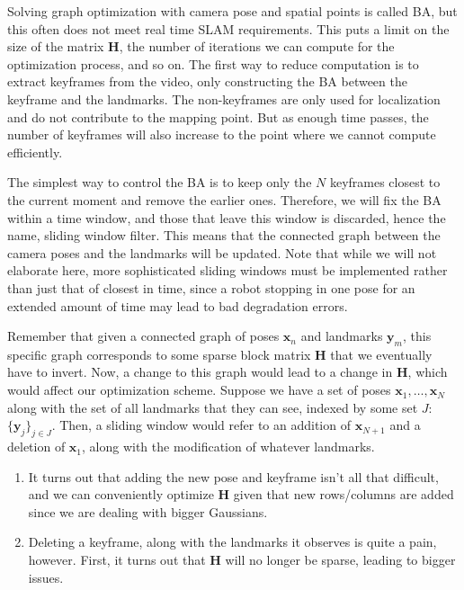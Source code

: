 \documentclass{article}
\begin{document}
  Solving graph optimization with camera pose and spatial points is called BA, but this often does not meet real time SLAM requirements. This puts a limit on the size of the matrix $\mathbf{H}$, the number of iterations we can compute for the optimization process, and so on. The first way to reduce computation is to extract keyframes from the video, only constructing the BA between the keyframe and the landmarks. The non-keyframes are only used for localization and do not contribute to the mapping point. But as enough time passes, the number of keyframes will also increase to the point where we cannot compute efficiently. 

  The simplest way to control the BA is to keep only the $N$ keyframes closest to the current moment and remove the earlier ones. Therefore, we will fix the BA within a time window, and those that leave this window is discarded, hence the name, sliding window filter. This means that the connected graph between the camera poses and the landmarks will be updated. Note that while we will not elaborate here, more sophisticated sliding windows must be implemented rather than just that of closest in time, since a robot stopping in one pose for an extended amount of time may lead to bad degradation errors. 

  Remember that given a connected graph of poses $\mathbf{x}_n$ and landmarks $\mathbf{y}_m$, this specific graph corresponds to some sparse block matrix $\mathbf{H}$ that we eventually have to invert. Now, a change to this graph would lead to a change in $\mathbf{H}$, which would affect our optimization scheme. Suppose we have a set of poses $\mathbf{x}_1, \ldots, \mathbf{x}_N$ along with the set of all landmarks that they can see, indexed by some set $J$: $\{\mathbf{y}_j\}_{j \in J}$. Then, a sliding window would refer to an addition of $\mathbf{x}_{N+1}$ and a deletion of $\mathbf{x}_1$, along with the modification of whatever landmarks. 
  \begin{enumerate}
      \item It turns out that adding the new pose and keyframe isn't all that difficult, and we can conveniently optimize $\mathbf{H}$ given that new rows/columns are added since we are dealing with bigger Gaussians. 
      \item Deleting a keyframe, along with the landmarks it observes is quite a pain, however. First, it turns out that $\mathbf{H}$ will no longer be sparse, leading to bigger issues. 
  \end{enumerate}
\end{document}
